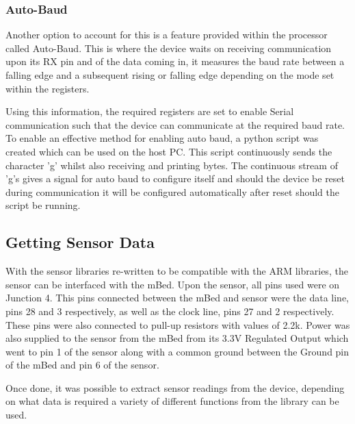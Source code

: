 \subsubsection{Auto-Baud}

Another option to account for this is a feature provided within the processor called Auto-Baud\cite{mbed_datasheet}. This is where the device waits on receiving communication upon its RX pin and of the data coming in, it measures the baud rate between a falling edge and a subsequent rising or falling edge depending on the mode set within the registers.

Using this information, the required registers are set to enable Serial communication such that the device can communicate at the required baud rate. To enable an effective method for enabling auto baud, a python script was created which can be used on the host PC. This script continuously sends the character 'g' whilst also receiving and printing bytes. The continuous stream of 'g's gives a signal for auto baud to configure itself and should the device be reset during communication it will be configured automatically after reset should the script be running.

\subsection{Getting Sensor Data}

With the sensor libraries re-written to be compatible with the ARM libraries, the sensor can be interfaced with the mBed. Upon the sensor, all pins used were on Junction 4. This pins connected between the mBed and sensor were the data line, pins 28 and 3 respectively, as well as the clock line, pins 27 and 2 respectively. These pins were also connected to pull-up resistors with values of 2.2k\ohm. Power was also supplied to the sensor from the mBed from its 3.3V Regulated Output which went to pin 1 of the sensor along with a common ground between the Ground pin of the mBed and pin 6 of the sensor. 

Once done, it was possible to extract sensor readings from the device, depending on what data is required a variety of different functions from the library can be used.

